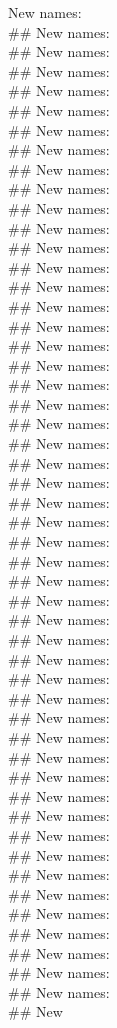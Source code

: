 \documentclass{article}\usepackage[]{graphicx}\usepackage[]{xcolor}
\makeatletter
\newenvironment{kframe}{%
 \def\at@end@of@kframe{}%
 \ifinner\ifhmode%
  \def\at@end@of@kframe{\end{minipage}}%
  \begin{minipage}{\columnwidth}%
 \fi\fi%
 \def\FrameCommand##1{\hskip\@totalleftmargin \hskip-\fboxsep
 \colorbox{shadecolor}{##1}\hskip-\fboxsep
     \hskip-\linewidth \hskip-\@totalleftmargin \hskip\columnwidth}%
 \MakeFramed {\advance\hsize-\width
   \@totalleftmargin\z@ \linewidth\hsize
   \@setminipage}}%
 {\par\unskip\endMakeFramed%
 \at@end@of@kframe}
\makeatother
\begin{document}
\begin{kframe}
 New names:\\\#\# New names:\\\#\# New names:\\\#\# New names:\\\#\# New names:\\\#\# New names:\\\#\# New names:\\\#\# New names:\\\#\# New names:\\\#\# New names:\\\#\# New names:\\\#\# New names:\\\#\# New names:\\\#\# New names:\\\#\# New names:\\\#\# New names:\\\#\# New names:\\\#\# New names:\\\#\# New names:\\\#\# New names:\\\#\# New names:\\\#\# New names:\\\#\# New names:\\\#\# New names:\\\#\# New names:\\\#\# New names:\\\#\# New names:\\\#\# New names:\\\#\# New names:\\\#\# New names:\\\#\# New names:\\\#\# New names:\\\#\# New names:\\\#\# New names:\\\#\# New names:\\\#\# New names:\\\#\# New names:\\\#\# New names:\\\#\# New names:\\\#\# New names:\\\#\# New names:\\\#\# New names:\\\#\# New names:\\\#\# New names:\\\#\# New names:\\\#\# New names:\\\#\# New names:\\\#\# New names:\\\#\# New names:\\\#\# New names:\\\#\# New names:\\\#\# New 
\end{kframe}
\end{document}
